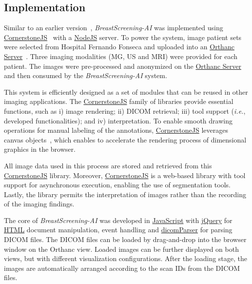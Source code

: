 \subsection{Implementation}
\label{sec:chap005004001}

Similar to an earlier version~\cite{https://doi.org/10.13140/rg.2.2.29816.70409}, {\it BreastScreening-AI} was implemented using \href{https://cornerstonejs.org/}{CornerstoneJS}~\cite{urban2017lesiontracker} with a \href{https://nodejs.org/}{NodeJS} server.
To power the system, image patient sets were selected from Hospital Fernando Fonseca and uploaded into an \href{https://www.orthanc-server.com}{Orthanc Server}~\cite{Jodogne2018}.
Three imaging modalities (\ac{MG}, \ac{US} and \ac{MRI}) were provided for each patient.
The images were pre-processed and anonymized on the \href{https://www.orthanc-server.com}{Orthanc Server} and then consumed by the {\it BreastScreening-AI} system.

This system is efficiently designed as a set of modules that can be reused in other imaging applications.
The \href{https://cornerstonejs.org/}{CornerstoneJS} family of libraries provide essential functions, such as i) image rendering; ii) DICOM retrieval; iii) tool support ({\it i.e.}, developed functionalities); and iv) interpretation.
To enable smooth drawing operations for manual labeling of the annotations, \href{https://cornerstonejs.org/}{CornerstoneJS} leverages canvas objects~\cite{mullie2019coreslicer}, which enables to accelerate the rendering process of dimensional graphics in the browser.

All image data used in this process are stored and retrieved from this \href{https://cornerstonejs.org/}{CornerstoneJS} library.
Moreover, \href{https://cornerstonejs.org/}{CornerstoneJS} is a web-based library with tool support for asynchronous execution, enabling the use of segmentation tools.
Lastly, the library permits the interpretation of images rather than the recording of the imaging findings.

The core of {\it BreastScreening-AI} was developed in \href{https://www.w3schools.com/js/}{JavaScript} with \href{https://jquery.com/}{jQuery} for \href{https://www.w3schools.com/html/}{HTML} document manipulation, event handling and \href{https://github.com/cornerstonejs/dicomParser}{dicomParser} for parsing DICOM files.
The DICOM files can be loaded by drag-and-drop into the browser window on the Orthanc view.
Loaded images can be further displayed on both views, but with different visualization configurations.
After the loading stage, the images are automatically arranged according to the scan IDs from the DICOM files.


